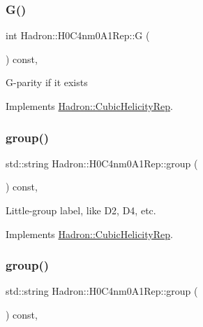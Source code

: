 \subsubsection{\texorpdfstring{G()}{G()}\hspace{0.1cm}{\footnotesize\ttfamily [3/3]}}
{\footnotesize\ttfamily int Hadron\+::\+H0\+C4nm0\+A1\+Rep\+::G (\begin{DoxyParamCaption}{ }\end{DoxyParamCaption}) const\hspace{0.3cm}{\ttfamily [inline]}, {\ttfamily [virtual]}}

G-\/parity if it exists 

Implements \mbox{\hyperlink{structHadron_1_1CubicHelicityRep_a50689f42be1e6170aa8cf6ad0597018b}{Hadron\+::\+Cubic\+Helicity\+Rep}}.

\mbox{\label{structHadron_1_1H0C4nm0A1Rep_a721e8c07bbc6143cad2cf745771be3f9}} 
\subsubsection{\texorpdfstring{group()}{group()}\hspace{0.1cm}{\footnotesize\ttfamily [1/5]}}
{\footnotesize\ttfamily std\+::string Hadron\+::\+H0\+C4nm0\+A1\+Rep\+::group (\begin{DoxyParamCaption}{ }\end{DoxyParamCaption}) const\hspace{0.3cm}{\ttfamily [inline]}, {\ttfamily [virtual]}}

Little-\/group label, like D2, D4, etc. 

Implements \mbox{\hyperlink{structHadron_1_1CubicHelicityRep_a101a7d76cd8ccdad0f272db44b766113}{Hadron\+::\+Cubic\+Helicity\+Rep}}.

\mbox{\label{structHadron_1_1H0C4nm0A1Rep_a721e8c07bbc6143cad2cf745771be3f9}} 
\subsubsection{\texorpdfstring{group()}{group()}\hspace{0.1cm}{\footnotesize\ttfamily [2/5]}}
{\footnotesize\ttfamily std\+::string Hadron\+::\+H0\+C4nm0\+A1\+Rep\+::group (\begin{DoxyParamCaption}{ }\end{DoxyParamCaption}) const\hspace{0.3cm}{\ttfamily [inline]}, {\ttfamily [virtual]}}


